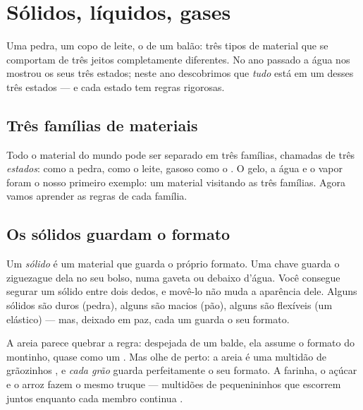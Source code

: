 \chapter{Sólidos, líquidos, gases}\label{ch:g3:solids-liquids-gases}

Uma pedra, um copo de leite, o  de um balão: três tipos de material
que se comportam de três jeitos completamente diferentes. No ano
passado a água nos mostrou os seus três estados; neste ano descobrimos
que \emph{tudo} está em um desses três estados --- e cada estado tem
regras rigorosas.

\section{Três famílias de materiais}

Todo o material do mundo pode ser separado em três famílias, chamadas
de três \emph{estados}:  como a pedra,  como o leite,
gasoso como o . O gelo, a água e o vapor foram o nosso primeiro
exemplo: um material visitando as três famílias. Agora vamos aprender
as regras de cada família.

\section{Os sólidos guardam o formato}

\begin{definition}[Sólido]\label{def:g3:solids-liquids-gases:solid}
Um \emph{sólido} é um material que guarda o próprio
formato. Uma chave guarda o ziguezague dela no seu bolso, numa gaveta
ou debaixo d'água. Você consegue segurar um sólido entre dois dedos,
e movê-lo não muda a aparência dele. Alguns sólidos são duros
(pedra), alguns são macios (pão), alguns são flexíveis (um elástico)
--- mas, deixado em paz, cada um guarda o seu formato.
\end{definition}

\begin{example}\label{ex:g3:solids-liquids-gases:sand}
A areia parece quebrar a regra: despejada de um balde, ela assume o
formato do montinho, quase como um . Mas olhe de perto: a
areia é uma multidão de grãozinhos , e \emph{cada grão} guarda
perfeitamente o seu formato. A farinha, o açúcar e o arroz fazem o
mesmo truque --- multidões de  pequenininhos que escorrem
juntos enquanto cada membro continua .
\end{example}


